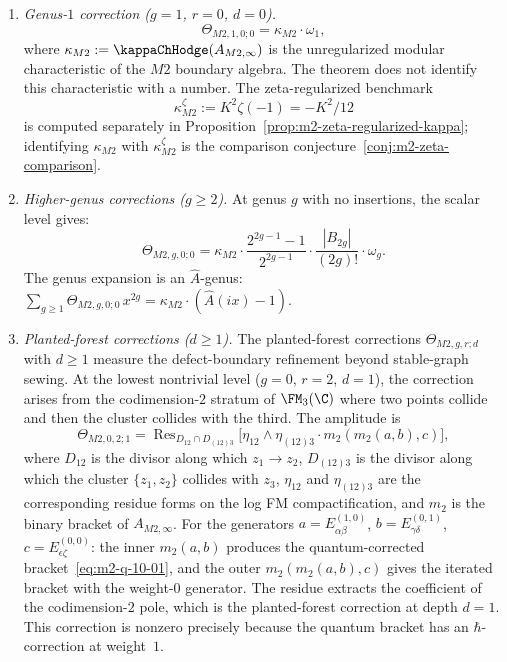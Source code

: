 \begin{theorem}
\begin{enumerate}[label=(\roman*),leftmargin=1.8em]
The shadow depth of $A_{M2,\infty}$ is \emph{infinite}:
the double-loop structure forces nontrivial higher
couplings at every degree, because the quantum correction
$[\partial,z]=\hbar$ generates cascading Jacobi anomalies.

\item \emph{Genus-$1$ correction ($g=1$, $r=0$, $d=0$).}
\begin{equation}%
\Theta_{M2,1,0;0}
= \kappa_{M2}\cdot\omega_1,
\end{equation}
where $\kappa_{M2}:=\kappaChHodge(A_{M2,\infty})$ is the
unregularized modular characteristic of the $M2$ boundary algebra.
The theorem does not identify this characteristic with a number.
The zeta-regularized benchmark
\[
\kappa_{M2}^{\zeta}:=K^2\zeta(-1)=-K^2/12
\]
is computed separately in Proposition~\ref{prop:m2-zeta-regularized-kappa};
identifying $\kappa_{M2}$ with $\kappa_{M2}^{\zeta}$ is the
comparison conjecture~\ref{conj:m2-zeta-comparison}.

\item \emph{Higher-genus corrections ($g\ge 2$).}
At genus $g$ with no insertions, the scalar level gives:
\begin{equation}%
\Theta_{M2,g,0;0}
= \kappa_{M2}\cdot\frac{2^{2g-1}-1}{2^{2g-1}}\cdot\frac{|B_{2g}|}{(2g)!}\cdot\omega_g.
\end{equation}
The genus expansion is an $\hat{A}$-genus:
$\sum_{g\ge 1}\Theta_{M2,g,0;0}\,x^{2g}
= \kappa_{M2}\cdot(\hat{A}(ix)-1)$.

\item \emph{Planted-forest corrections ($d\ge 1$).}
The planted-forest corrections $\Theta_{M2,g,r;d}$ with
$d\ge 1$ measure the defect-boundary refinement beyond
stable-graph sewing. At the lowest nontrivial level
($g=0$, $r=2$, $d=1$), the correction arises from the
codimension-$2$ stratum of $\FM_3(\C)$ where two points
collide and then the cluster collides with the third.
The amplitude is
\begin{equation}%
\Theta_{M2,0,2;1}
= \operatorname{Res}_{D_{12}\cap D_{(12)3}}
\bigl[\eta_{12}\wedge\eta_{(12)3}\cdot
m_2(m_2(a,b),c)\bigr],
\end{equation}
where $D_{12}$ is the divisor along which $z_1\to z_2$,
$D_{(12)3}$ is the divisor along which the cluster
$\{z_1,z_2\}$ collides with $z_3$, $\eta_{12}$ and
$\eta_{(12)3}$ are the corresponding residue forms on
the log FM compactification, and $m_2$ is the binary
bracket of $A_{M2,\infty}$. For the generators
$a=E^{(1,0)}_{\alpha\beta}$, $b=E^{(0,1)}_{\gamma\delta}$,
$c=E^{(0,0)}_{\epsilon\zeta}$: the inner $m_2(a,b)$
produces the quantum-corrected bracket~\eqref{eq:m2-q-10-01},
and the outer $m_2(m_2(a,b),c)$ gives the iterated bracket
with the weight-$0$ generator. The residue extracts the
coefficient of the codimension-$2$ pole, which is the
planted-forest correction at depth $d=1$. This correction
is nonzero precisely because the quantum bracket has an
$\hbar$-correction at weight~$1$.
\end{enumerate}
\end{theorem}

